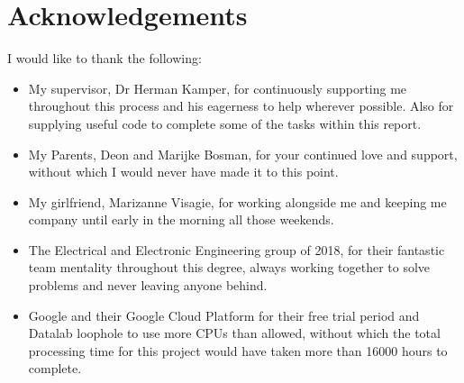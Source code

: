 \chapter*{Acknowledgements}
\makeatletter{}\makeatother

I would like to thank the following:

\begin{itemize}
\item My supervisor, Dr
Herman Kamper, for continuously supporting me throughout this process and his eagerness to help wherever possible.
Also for supplying useful code to complete some of the tasks within this report.
\item My Parents, Deon and Marijke Bosman, for your continued love and support, without which I would never have made it to this point.
\item My girlfriend, Marizanne Visagie, for working alongside me and keeping me company until early in the morning all those weekends.
\item The Electrical and Electronic Engineering group of 2018, for their fantastic team mentality throughout this degree, always working together to solve problems and never leaving anyone behind.
\item Google and their Google Cloud Platform for their free trial period and Datalab loophole to use more CPUs than allowed, without which the total processing time for this project would have taken more than 16000 hours to complete. 
\end{itemize}